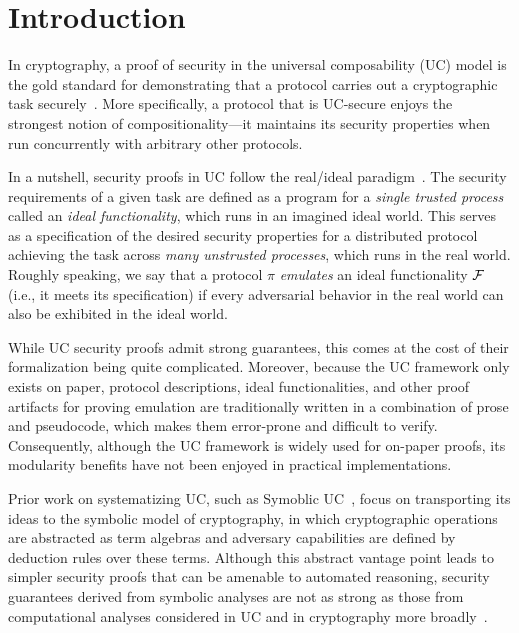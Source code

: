 \section{Introduction}
\label{sec:introduction}

In cryptography, a proof of security in the universal composability (UC) model
is the gold standard for demonstrating that a protocol carries out a
cryptographic task securely~\cite{canetti2001universally}. More specifically, a
protocol that is UC-secure enjoys the strongest notion of compositionality---it
maintains its security properties when run concurrently with arbitrary other
protocols.

In a nutshell, security proofs in UC follow the real/ideal
paradigm~\cite{goldreich1987play}. The security requirements of a given task are
defined as a program for a \emph{single trusted process} called an \emph{ideal
  functionality}, which runs in an imagined ideal world. This serves as a
specification of the desired security properties for a distributed protocol
achieving the task across \emph{many unstrusted processes}, which runs in the
real world. Roughly speaking, we say that a protocol $\pi$ \emph{emulates} an
ideal functionality $\mathcal{{F}}$ (i.e., it meets its specification) if every
adversarial behavior in the real world can also be exhibited in the ideal world.

While UC security proofs admit strong guarantees, this comes at the cost of
their formalization being quite complicated. Moreover, because the UC framework
only exists on paper, protocol descriptions, ideal functionalities, and other
proof artifacts for proving emulation are traditionally written in a combination
of prose and pseudocode, which makes them error-prone and difficult to
verify. Consequently, although the UC framework is widely used for on-paper
proofs, its modularity benefits have not been enjoyed in practical
implementations.

Prior work on systematizing UC, such as Symoblic UC~\cite{bohl2016symbolic},
focus on transporting its ideas to the symbolic model of cryptography, in which
cryptographic operations are abstracted as term algebras and adversary
capabilities are defined by deduction rules over these terms. Although this
abstract vantage point leads to simpler security proofs that can be amenable to
automated reasoning, security guarantees derived from symbolic analyses are not
as strong as those from computational analyses considered in UC and in
cryptography more broadly~\cite{cortier2011survey}.

